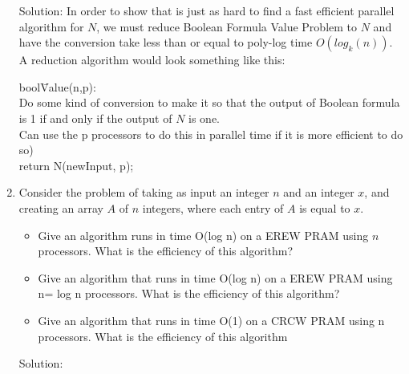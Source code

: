 \documentclass{article}
\begin{document}
\begin{enumerate}
Solution: In order to show that is just as hard to find a fast efficient parallel algorithm for $N$, we must reduce Boolean Formula Value Problem to $N$ and have the conversion take less than or equal to poly-log time $O(log_k(n))$. A reduction algorithm would look something like this:

\begin{tabbing}
bool\=Value(n,p):\\
\>Do some kind of conversion to make it so that the output of Boolean formula is 1 if and only if the output of $N$ is one. \\
\>Can use the p processors to do this in parallel time if it is more efficient to do so)\\
\> return N(newInput, p);\\
\end{tabbing}
\item  Consider the problem of taking as input an integer $n$ and an integer $x$, and creating an array $A$ of $n$
\newline integers, where each entry of $A$ is equal to $x$.
\begin{itemize} 
\item Give an algorithm runs in time O(log n) on a EREW PRAM using $n$ processors. What is the
\newline efficiency of this algorithm?
\item Give an algorithm that runs in time O(log n) on a EREW PRAM using n= log n processors. What
\newline is the efficiency of this algorithm?
\item Give an algorithm that runs in time O(1) on a CRCW PRAM using n processors. What is the
\newline efficiency of this algorithm
\end{itemize}

Solution:
\end{enumerate}
\end{document}
